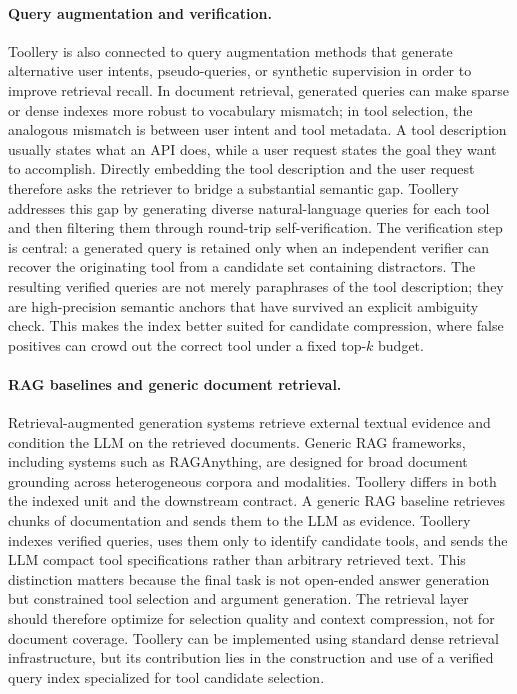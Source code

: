 \documentclass[11pt]{article}
\begin{document}
\paragraph{Query augmentation and verification.}
Toollery is also connected to query augmentation methods that generate alternative user intents, pseudo-queries, or synthetic supervision in order to improve retrieval recall. In document retrieval, generated queries can make sparse or dense indexes more robust to vocabulary mismatch; in tool selection, the analogous mismatch is between user intent and tool metadata. A tool description usually states what an API does, while a user request states the goal they want to accomplish. Directly embedding the tool description and the user request therefore asks the retriever to bridge a substantial semantic gap. Toollery addresses this gap by generating diverse natural-language queries for each tool and then filtering them through round-trip self-verification. The verification step is central: a generated query is retained only when an independent verifier can recover the originating tool from a candidate set containing distractors. The resulting verified queries are not merely paraphrases of the tool description; they are high-precision semantic anchors that have survived an explicit ambiguity check. This makes the index better suited for candidate compression, where false positives can crowd out the correct tool under a fixed top-$k$ budget.

\paragraph{RAG baselines and generic document retrieval.}
Retrieval-augmented generation systems retrieve external textual evidence and condition the LLM on the retrieved documents. Generic RAG frameworks, including systems such as RAGAnything, are designed for broad document grounding across heterogeneous corpora and modalities. Toollery differs in both the indexed unit and the downstream contract. A generic RAG baseline retrieves chunks of documentation and sends them to the LLM as evidence. Toollery indexes verified queries, uses them only to identify candidate tools, and sends the LLM compact tool specifications rather than arbitrary retrieved text. This distinction matters because the final task is not open-ended answer generation but constrained tool selection and argument generation. The retrieval layer should therefore optimize for selection quality and context compression, not for document coverage. Toollery can be implemented using standard dense retrieval infrastructure, but its contribution lies in the construction and use of a verified query index specialized for tool candidate selection.
\end{document}
